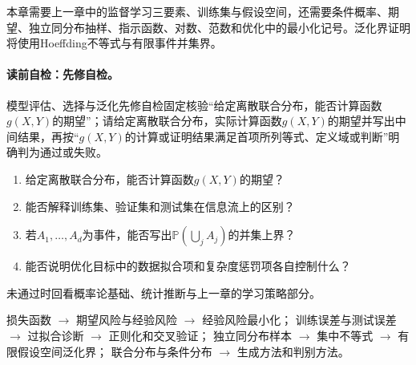 
\label{struct:V1-C10-CH02}
\begin{prerequisitebox}
本章需要上一章中的监督学习三要素、训练集与假设空间，还需要条件概率、期望、独立同分布抽样、指示函数、对数、范数和优化中的最小化记号。泛化界证明将使用Hoeffding不等式与有限事件并集界。
\end{prerequisitebox}

\label{struct:V1-C10-CH03}
\paragraph{读前自检：先修自检。}模型评估、选择与泛化先修自检固定核验“给定离散联合分布，能否计算函数$g(X,Y)$的期望”；请给定离散联合分布，实际计算函数$g(X,Y)$的期望并写出中间结果，再按“$g(X,Y)$的计算或证明结果满足首项所列等式、定义域或判断”明确判为通过或失败。\par

\begin{precheckbox}
\begin{enumerate}[leftmargin=2.2em]
  \item 给定离散联合分布，能否计算函数$g(X,Y)$的期望？
  \item 能否解释训练集、验证集和测试集在信息流上的区别？
  \item 若$A_1,\ldots,A_d$为事件，能否写出$\mathbb P(\bigcup_j A_j)$的并集上界？
  \item 能否说明优化目标中的数据拟合项和复杂度惩罚项各自控制什么？
\end{enumerate}
未通过时回看概率论基础、统计推断与上一章的学习策略部分。
\end{precheckbox}

\label{struct:V1-C10-CH04}
\begin{dependencybox}
损失函数 $\to$ 期望风险与经验风险 $\to$ 经验风险最小化；
训练误差与测试误差 $\to$ 过拟合诊断 $\to$ 正则化和交叉验证；
独立同分布样本 $\to$ 集中不等式 $\to$ 有限假设空间泛化界；
联合分布与条件分布 $\to$ 生成方法和判别方法。
\end{dependencybox}

